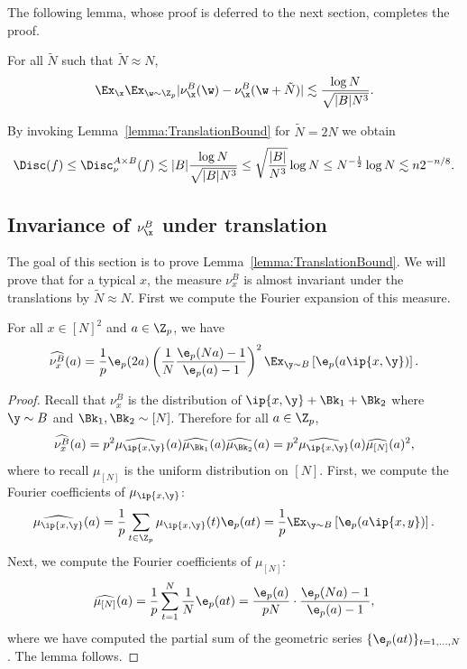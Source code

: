  The following lemma, whose proof is deferred to the next section, completes the proof.
 \begin{lemma}\label{lemma:TranslationBound}
	For all $\tilde{N}$ such that $\tilde{N}\approx N$, $$ \Ex_\x  \Ex_{\w \sim \Z_p} |\nu_{\x}^B(\w) -\nu_{\x}^B(\w+\tilde{N})|\lesssim \frac{\log N}{\sqrt{|B|N^3}}.$$
\end{lemma}

	By invoking Lemma~\ref{lemma:TranslationBound} for $\tilde{N}=2N$ we obtain
%
	$$ \Disc(f) \leq \Disc^{A \times B}_\nu(f) \lesssim  |B| \frac{\log N  }{\sqrt{|B|N^3}}\leq \sqrt{\frac{|B|}{N^3}}\log N \leq N^{-\frac{1}{2}}\log N \lesssim n 2^{-n/8}.$$


\subsection{Invariance of $\nu^B_\x$ under translation}
The goal of this section is to prove Lemma~\ref{lemma:TranslationBound}.
We will prove that for a typical $x$, the measure $\nu^B_x$ is almost invariant under the translations by  $\tilde{N} \approx N$. First we compute the Fourier  expansion of this measure.

\begin{lemma}\label{lemma:fouriercoeffs}
	For all $x \in [N]^2$ and $a\in \Z_p$, we have
	$$\widehat{\nu^B_x}(a) =  \frac{1}{p} \e_p(2a)   \left(\frac{1}{N} \frac{\e_p(Na)-1}{\e_p(a)-1}\right)^2   \Ex_{\y \sim B}   \left[ \e_p(a\ip{x,\y})\right].
	$$
\end{lemma}
\begin{proof}
	Recall that $\nu^B_x$ is the distribution of $\ip{x,\y}+\Bk_1+\Bk_2$ where $\y\sim B$ and $\Bk_1,\Bk_2\sim [N]$. Therefore for all $a\in \Z_p$,
	$$\widehat{\nu^B_x}(a) = p^2\widehat{\mu_{\ip{x,\y}}}(a)\widehat{\mu_{\Bk_1}}(a)\widehat{\mu_{\Bk_2}}(a) =  p^2\widehat{\mu_{\ip{x,\y}}}(a)\widehat{\mu_{[N]}}(a)^2,$$
	where to recall $\mu_{[N]}$ is the uniform distribution on $[N]$. First, we compute the Fourier coefficients of $\mu_{\ip{x,\y}}$:
	$$
		\widehat{\mu_{\ip{x,\y}}}(a) = \frac{1}{p}\sum_{t \in \Z_p} \mu_{\ip{x,\y}}(t) \e_p(at)= \frac{1}{p}  \Ex_{\y \sim B} \left[\e_p(a\ip{x,y})\right].
$$
Next, we compute the Fourier coefficients of $\mu_{[N]}$:
	$$\widehat{\mu_{[N]}}(a) =  \frac{1}{p}  \sum_{t=1}^{N} \frac{1}{N} \e_p(at) = \frac{\e_p(a)}{pN} \cdot \frac{\e_p(Na)-1}{\e_p(a)-1},$$
	where we have computed the partial sum of the geometric series $\{\e_p(at)\}_{t=1,\ldots,N}$.
The lemma follows. 
\end{proof}

